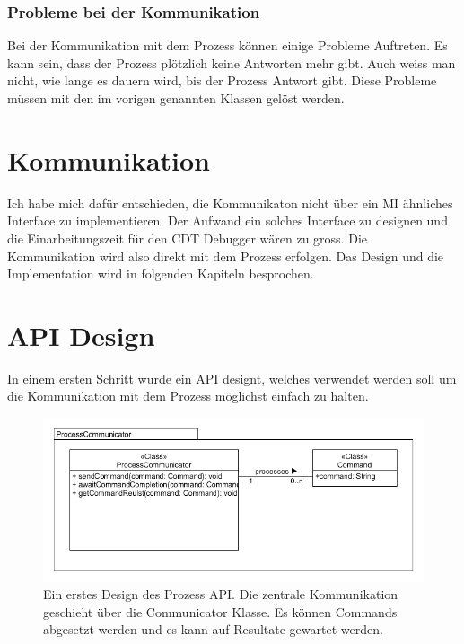 \subsubsection{Probleme bei der Kommunikation}

Bei der Kommunikation mit dem Prozess können einige Probleme Auftreten. Es kann sein, dass der Prozess plötzlich keine Antworten mehr gibt. Auch weiss man nicht, wie lange es dauern wird, bis der Prozess Antwort gibt. Diese Probleme müssen mit den im vorigen genannten Klassen gelöst werden.

\section{Kommunikation}

Ich habe mich dafür entschieden, die Kommunikaton nicht über ein MI ähnliches Interface zu implementieren. Der Aufwand ein solches Interface zu designen und die Einarbeitungszeit für den CDT Debugger wären zu gross. Die Kommunikation wird also direkt mit dem Prozess erfolgen. Das Design und die Implementation wird in folgenden Kapiteln besprochen.


\section{API Design}

In einem ersten Schritt wurde ein API designt, welches verwendet werden soll um die Kommunikation mit dem Prozess möglichst einfach zu halten.

\begin{figure}[H]
	\centering
		\includegraphics[scale=0.6]{forthcommunication/api.png}
		\caption{Ein erstes Design des Prozess API. Die zentrale Kommunikation geschieht über die Communicator Klasse. Es können Commands abgesetzt werden und es kann auf Resultate gewartet werden.}
		\label{fig:extensionpoint}
\end{figure}

